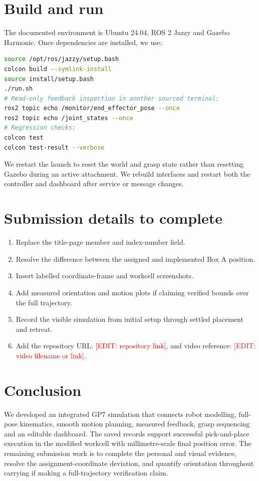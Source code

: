 \documentclass[11pt,a4paper]{report}
\newcommand{\edit}[1]{\textcolor{red}{[EDIT: #1]}}
\begin{document}
\section{Build and run}
The documented environment is Ubuntu 24.04, ROS 2 Jazzy and Gazebo Harmonic. Once dependencies are installed, we use:
\begin{lstlisting}[language=bash]
source /opt/ros/jazzy/setup.bash
colcon build --symlink-install
source install/setup.bash
./run.sh
# Read-only feedback inspection in another sourced terminal:
ros2 topic echo /monitor/end_effector_pose --once
ros2 topic echo /joint_states --once
# Regression checks:
colcon test
colcon test-result --verbose
\end{lstlisting}
We restart the launch to reset the world and grasp state rather than resetting Gazebo during an active attachment. We rebuild interfaces and restart both the controller and dashboard after service or message changes.
\section{Submission details to complete}
\begin{enumerate}
\item Replace the title-page member and index-number field.
\item Resolve the difference between the assigned and implemented Box A position.
\item Insert labelled coordinate-frame and workcell screenshots.
\item Add measured orientation and motion plots if claiming verified bounds over the full trajectory.
\item Record the visible simulation from initial setup through settled placement and retreat.
\item Add the repository URL: \edit{repository link}, and video reference: \edit{video filename or link}.
\end{enumerate}
\section{Conclusion}
We developed an integrated GP7 simulation that connects robot modelling, full-pose kinematics, smooth motion planning, measured feedback, grasp sequencing and an editable dashboard. The saved records support successful pick-and-place execution in the modified workcell with millimetre-scale final position error. The remaining submission work is to complete the personal and visual evidence, resolve the assignment-coordinate deviation, and quantify orientation throughout carrying if making a full-trajectory verification claim.
\appendix
\end{document}
